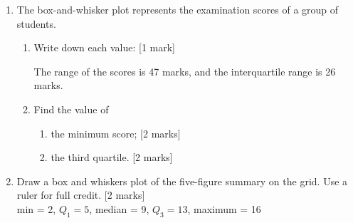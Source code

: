 \documentclass[12pt, twoside]{article}
\begin{document}
\begin{enumerate}
\item The box-and-whisker plot represents the examination scores of a group of students.
  \begin{center}
  \end{center}
  \begin{enumerate}
    \item Write down each value: \hfill [1 mark]
    \begin{enumerate}
    \end{enumerate} \vspace{0.5cm}
    The range of the scores is 47 marks, and the interquartile range is 26 marks. \vspace{0.5cm}
    \item Find the value of
    \begin{enumerate}
      \item the minimum score; \hfill [2 marks] \vspace{1cm}
      \item the third quartile. \hfill [2 marks]
    \end{enumerate}
  \end{enumerate}

\newpage
\item Draw a box and whiskers plot of the five-figure summary on the grid. Use a ruler for full credit. \hfill [2 marks] \vspace{0.25cm}\\
min = 2, $Q_1=5$, median = 9, $Q_3=13$, maximum = 16


\end{enumerate}
\end{document}
